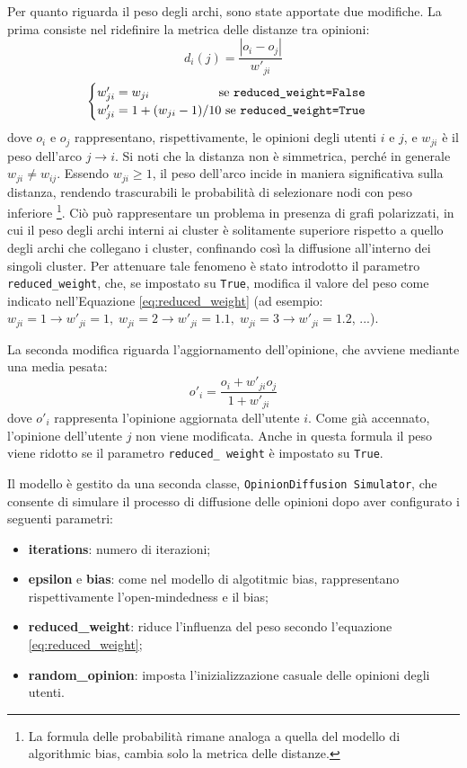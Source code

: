 \documentclass[sigchi]{acmart}
\begin{document}
Per quanto riguarda il peso degli archi, sono state apportate due modifiche. La prima consiste nel ridefinire la metrica delle distanze tra opinioni:
\begin{equation}
    d_i(j) = \frac{|o_i - o_j|}{w'_{ji}} 
\end{equation}
\begin{equation}
    \begin{cases}
        w'_{ji} = w_{ji} \hfill \text{se } \texttt{reduced\_weight=False} \\
        w'_{ji} = 1 + (w_{ji} - 1)/10 \hfill \text{   se } \texttt{reduced\_weight=True}
    \end{cases}
    \label{eq:reduced_weight}
\end{equation}
dove $o_i$ e $o_j$ rappresentano, rispettivamente, le opinioni degli utenti $i$ e $j$, e $w_{ji}$ è il peso dell'arco $j \rightarrow i$. Si noti che la distanza non è simmetrica, perché in generale $w_{ji} \neq w_{ij}$. Essendo $w_{ji} \geq 1$, il peso dell'arco incide in maniera significativa sulla distanza, rendendo trascurabili le probabilità di selezionare nodi con peso inferiore \footnote{La formula delle probabilità rimane analoga a quella del modello di algorithmic bias, cambia solo la metrica delle distanze.}. Ciò può rappresentare un problema in presenza di grafi polarizzati, in cui il peso degli archi interni ai cluster è solitamente superiore rispetto a quello degli archi che collegano i cluster, confinando così la diffusione all'interno dei singoli cluster. Per attenuare tale fenomeno è stato introdotto il parametro \texttt{reduced\_weight}, che, se impostato su \texttt{True}, modifica il valore del peso come indicato nell'Equazione \ref{eq:reduced_weight} (ad esempio: $w_{ji} = 1 \rightarrow w'_{ji} = 1, \; w_{ji} = 2 \rightarrow w'_{ji} = 1.1,\; w_{ji} = 3 \rightarrow w'_{ji} = 1.2$, ...).

La seconda modifica riguarda l'aggiornamento dell'opinione, che avviene mediante una media pesata:
\begin{equation}
    o'_i = \frac{o_i + w'_{ji}o_j}{1+w'_{ji}}
\end{equation}
dove $o'_i$ rappresenta l'opinione aggiornata dell'utente $i$. Come già accennato, l'opinione dell'utente $j$ non viene modificata. Anche in questa formula il peso viene ridotto se il parametro  \texttt{reduced\_ weight} è impostato su \texttt{True}.

Il modello è gestito da una seconda classe, \texttt{OpinionDiffusion Simulator}, che consente di simulare il processo di diffusione delle opinioni dopo aver configurato i seguenti parametri:
\begin{itemize}
    \item \textbf{iterations}: numero di iterazioni;
    \item \textbf{epsilon} e \textbf{bias}: come nel modello di  algotitmic bias, rappresentano rispettivamente l'open-mindedness e il bias;
    \item \textbf{reduced\_weight}: riduce l'influenza del peso secondo l'equazione \ref{eq:reduced_weight};
    \item \textbf{random\_opinion}: imposta l'inizializzazione casuale delle opinioni degli utenti.
\end{itemize}
\end{document}
